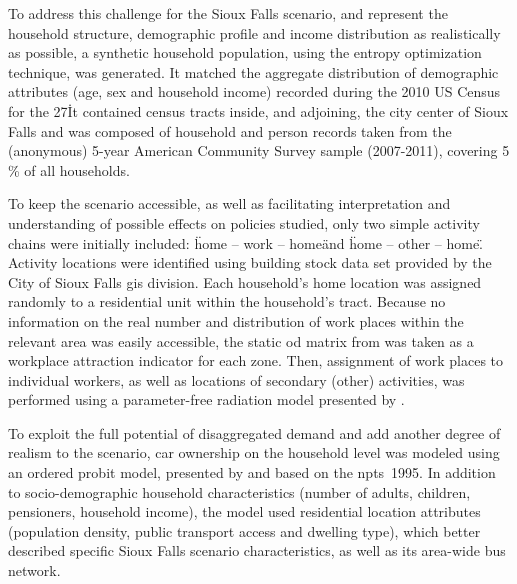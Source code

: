 To address this challenge for the Sioux Falls scenario, and represent the household structure, demographic profile and income distribution as realistically as possible, a synthetic household population, using the \citet[][]{BarGeraEtAl_TRB_2009} entropy optimization technique, was generated. It matched the aggregate distribution of demographic attributes (age, sex and household income) recorded during the 2010 US Census for the 27\. It contained census tracts inside, and adjoining, the city center of Sioux Falls and was composed of household and person records taken from the (anonymous) 5-year American Community Survey sample (2007-2011), covering 5\,\% of all households.

To keep the scenario accessible, as well as facilitating interpretation and understanding of possible effects on policies studied, only two simple activity chains were initially included: \"home – work – home\" and \"home – other – home\". Activity locations were identified using building stock data set provided by the City of Sioux Falls \gls{gis} division. Each household's home location was assigned randomly to a residential unit within the household's tract. Because no information on the real number and distribution of work places within the relevant area was easily accessible, the static \gls{od} matrix from \citet[][]{LeBlancEtAl_TransRes_1975} was taken as a workplace attraction indicator for each zone. Then, assignment of work places to individual workers, as well as locations of secondary (other) activities, was performed using a parameter-free radiation model presented by \citet[][]{SiminiEtAl_NAT_2012}.

To exploit the full potential of disaggregated demand and add another degree of realism to the scenario, car ownership on the household level was modeled using an ordered probit model, presented by \citet[][]{GiulianoDargay_TransResA_2006} and based on the \gls{npts}~1995. In addition to socio-demographic household characteristics (number of adults, children, pensioners, household income), the model used residential location attributes (population density, public transport access and dwelling type), which better described specific Sioux Falls scenario characteristics, as well as its area-wide bus network. 

